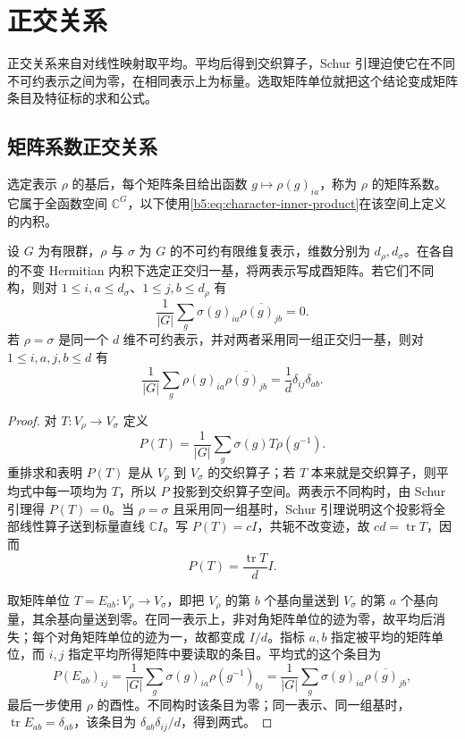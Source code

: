 

\section{正交关系}
\label{b5:sec:0202}

正交关系来自对线性映射取平均。平均后得到交织算子，Schur 引理迫使它在不同不可约表示之间为零，在相同表示上为标量。选取矩阵单位就把这个结论变成矩阵条目及特征标的求和公式。


\subsection{矩阵系数正交关系}
\label{b5:subsec:0202:01}

选定表示 \(\rho\) 的基后，每个矩阵条目给出函数 \(g\mapsto\rho(g)_{ia}\)，称为 \(\rho\) 的矩阵系数。它属于全函数空间 \(\mathbb C^G\)，以下使用\eqref{b5:eq:character-inner-product}在该空间上定义的内积。

\begin{theorem}[矩阵系数正交]\label{b5:thm:matrix-coefficient-orthogonality}
	设 \(G\) 为有限群，\(\rho\) 与 \(\sigma\) 为 \(G\) 的不可约有限维复表示，维数分别为 \(d_\rho,d_\sigma\)。在各自的不变 Hermitian 内积下选定正交归一基，将两表示写成酉矩阵。若它们不同构，则对 \(1\le i,a\le d_\sigma\)、\(1\le j,b\le d_\rho\) 有
	\[
		\frac1{|G|}\sum_g\sigma(g)_{ia}\overline{\rho(g)_{jb}}=0.
	\]
	若 \(\rho=\sigma\) 是同一个 \(d\) 维不可约表示，并对两者采用同一组正交归一基，则对 \(1\le i,a,j,b\le d\) 有
	\[
		\frac1{|G|}\sum_g\rho(g)_{ia}\overline{\rho(g)_{jb}} =\frac1d\delta_{ij}\delta_{ab}.
	\]
\end{theorem}
\begin{proof}
	对 \(T:V_\rho\to V_\sigma\) 定义
	\[
		P(T)=\frac1{|G|}\sum_g\sigma(g)T\rho(g^{-1}).
	\]
	重排求和表明 \(P(T)\) 是从 \(V_\rho\) 到 \(V_\sigma\) 的交织算子；若 \(T\) 本来就是交织算子，则平均式中每一项均为 \(T\)，所以 \(P\) 投影到交织算子空间。两表示不同构时，由 Schur 引理得 \(P(T)=0\)。当 \(\rho=\sigma\) 且采用同一组基时，Schur 引理说明这个投影将全部线性算子送到标量直线 \(\mathbb C I\)。写 \(P(T)=cI\)，共轭不改变迹，故 \(cd=\operatorname{tr}T\)，因而
	\[
		P(T)=\frac{\operatorname{tr}T}{d}I.
	\]

	取矩阵单位 \(T=E_{ab}:V_\rho\to V_\sigma\)，即把 \(V_\rho\) 的第 \(b\) 个基向量送到 \(V_\sigma\) 的第 \(a\) 个基向量，其余基向量送到零。在同一表示上，非对角矩阵单位的迹为零，故平均后消失；每个对角矩阵单位的迹为一，故都变成 \(I/d\)。指标 \(a,b\) 指定被平均的矩阵单位，而 \(i,j\) 指定平均所得矩阵中要读取的条目。平均式的这个条目为
	\[
		P(E_{ab})_{ij} =\frac1{|G|}\sum_g\sigma(g)_{ia}\rho(g^{-1})_{bj} =\frac1{|G|}\sum_g\sigma(g)_{ia}\overline{\rho(g)_{jb}},
	\]
	最后一步使用 \(\rho\) 的酉性。不同构时该条目为零；同一表示、同一组基时，\(\operatorname{tr}E_{ab}=\delta_{ab}\)，该条目为 \(\delta_{ab}\delta_{ij}/d\)，得到两式。
\end{proof}

